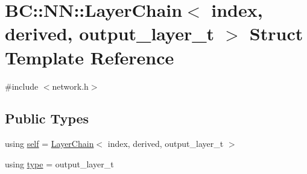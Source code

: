 \hypertarget{structBC_1_1NN_1_1LayerChain_3_01index_00_01derived_00_01output__layer__t_01_4}{}\section{BC\+:\+:NN\+:\+:Layer\+Chain$<$ index, derived, output\+\_\+layer\+\_\+t $>$ Struct Template Reference}
\label{structBC_1_1NN_1_1LayerChain_3_01index_00_01derived_00_01output__layer__t_01_4}


{\ttfamily \#include $<$network.\+h$>$}

\subsection*{Public Types}
\begin{DoxyCompactItemize}
\item 
using \hyperlink{structBC_1_1NN_1_1LayerChain_3_01index_00_01derived_00_01output__layer__t_01_4_a88d5f27bbae831089991526e51e59c53}{self} = \hyperlink{structBC_1_1NN_1_1LayerChain}{Layer\+Chain}$<$ index, derived, output\+\_\+layer\+\_\+t $>$
\item 
using \hyperlink{structBC_1_1NN_1_1LayerChain_3_01index_00_01derived_00_01output__layer__t_01_4_a44772210953e4d1df0dad63043048c76}{type} = output\+\_\+layer\+\_\+t
\end{DoxyCompactItemize}
